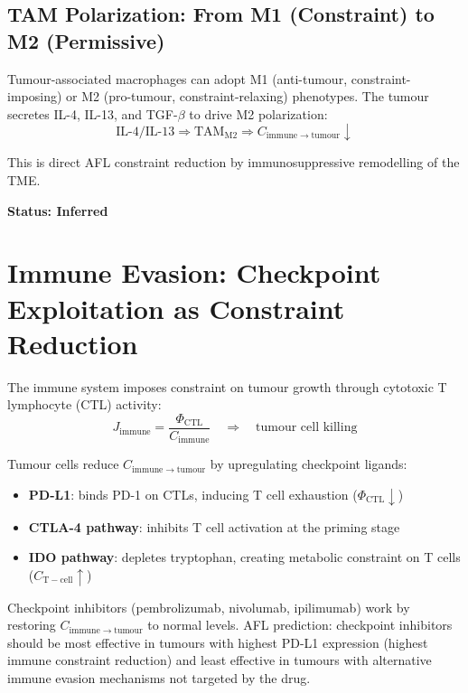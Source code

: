 \documentclass[12pt,a4paper]{article}
\begin{document}
\subsection{TAM Polarization: From M1 (Constraint) to M2 (Permissive)}

Tumour-associated macrophages can adopt M1 (anti-tumour, constraint-imposing) or M2 (pro-tumour, constraint-relaxing) phenotypes. The tumour secretes IL-4, IL-13, and TGF-$\beta$ to drive M2 polarization:
\begin{equation}
    \text{IL-4/IL-13} \Rightarrow \mathrm{TAM_{M2}} \Rightarrow C_{\mathrm{immune \to tumour}} \downarrow
\end{equation}

This is direct AFL constraint reduction by immunosuppressive remodelling of the TME.

\textbf{Status: Inferred}

\section{Immune Evasion: Checkpoint Exploitation as Constraint Reduction}

The immune system imposes constraint on tumour growth through cytotoxic T lymphocyte (CTL) activity:
\begin{equation}
    J_{\mathrm{immune}} = \frac{\Phi_{\mathrm{CTL}}}{ C_{\mathrm{immune}}} \quad \Rightarrow \quad \text{tumour cell killing}
\end{equation}

Tumour cells reduce $C_{\mathrm{immune \to tumour}}$ by upregulating checkpoint ligands:
\begin{itemize}
    \item \textbf{PD-L1}: binds PD-1 on CTLs, inducing T cell exhaustion ($\Phi_{\mathrm{CTL}} \downarrow$)
    \item \textbf{CTLA-4 pathway}: inhibits T cell activation at the priming stage
    \item \textbf{IDO pathway}: depletes tryptophan, creating metabolic constraint on T cells ($C_{\mathrm{T-cell}} \uparrow$)
\end{itemize}

Checkpoint inhibitors (pembrolizumab, nivolumab, ipilimumab) work by restoring $C_{\mathrm{immune \to tumour}}$ to normal levels. AFL prediction: checkpoint inhibitors should be most effective in tumours with highest PD-L1 expression (highest immune constraint reduction) and least effective in tumours with alternative immune evasion mechanisms not targeted by the drug.
\end{document}
